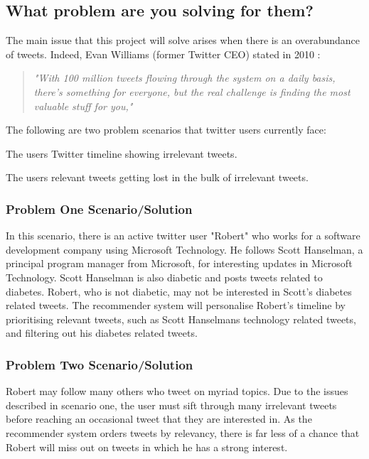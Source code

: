 \documentclass{article}
\begin{document}
\subsection{What problem are you solving for them?}
The main issue that this project will solve arises when there is an overabundance of tweets. Indeed, Evan Williams (former Twitter CEO) stated in 2010 \cite{ceo}:

\begin{quote}
    \emph{\small "With 100 million tweets flowing through the system on a daily basis, there's something for everyone, but the real challenge is finding the most valuable stuff for you,"}  
\end{quote}

\begin{samepage}
\noindent The following are two problem scenarios that twitter users currently face:

\begin{itemize*}
	 \item The users Twitter timeline showing irrelevant tweets.
	 \item The users relevant tweets getting lost in the bulk of irrelevant tweets.
\end{itemize*}

\subsubsection*{Problem One Scenario/Solution} %
In this scenario, there is an active twitter user "Robert" who works for a software development company using Microsoft Technology. He follows Scott Hanselman, a principal program manager from Microsoft, for interesting updates in Microsoft Technology. Scott Hanselman is also diabetic and posts tweets related to diabetes. Robert, who is not diabetic, may not be interested in Scott's diabetes related tweets. The recommender system will personalise Robert's timeline by prioritising relevant tweets, such as Scott Hanselmans technology related tweets, and filtering out his diabetes related tweets. 

\subsubsection*{Problem Two Scenario/Solution} %
Robert may follow many others who tweet on myriad topics. Due to the issues described in scenario one, the user must sift through many irrelevant tweets before reaching an occasional tweet that they are interested in. As the recommender system orders tweets by relevancy, there is far less of a chance that Robert will miss out on tweets in which he has a strong interest.
\end{samepage}
\end{document}
